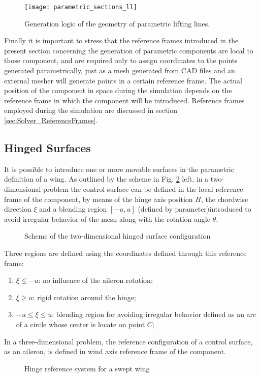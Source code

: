 \begin{figure}[h]
\centering
\texttt{[image: parametric\_sections\_ll]}
\caption{Generation logic of the geometry of parametric lifting lines.}
\label{fig:parametric_sections_ll}
\end{figure}

Finally it is important to stress that the reference frames introduced in the present section concerning the generation of parametric components are local to those component, and are required only to assign coordinates to the points generated parametrically, just as a mesh generated from CAD files and an external mesher will generate points in a certain reference frame. The actual position of the component in space during the simulation depends on the reference frame in which the component will be introduced. Reference frames employed during the simulation are discussed in section \ref{sec:Solver_ReferenceFrames}.

\subsection{Hinged Surfaces}
\label{sec:Hinge_surfaces}
It is possible to introduce one or more movable surfaces in the parametric definition of a wing.
As outlined by the scheme in Fig. \ref{fig:hinge} left, in a two-dimensional problem the control surface can be defined in the local reference frame of the component, by means of the hinge axis position $H$, the chordwise direction $\xi$ and a blending region $[-u, u]$ (defined by  parameter)introduced to avoid irregular behavior of the mesh along with the rotation angle $\theta$.
\begin{figure}[htbp]
\vspace{-3cm}
\centering
    \def\svgwidth{\columnwidth}
    
    \caption{Scheme of the two-dimensional hinged surface configuration}
    \label{fig:hinge}
\end{figure}
Three regions are defined using the coordinates defined through this reference frame:
\begin{enumerate}
 \item $\xi \leq -u$: no influence of the aileron rotation;
 \item $\xi \geq  u$: rigid rotation around the hinge;
 \item $-u \le \xi \le  u$: blending region for avoiding irregular behavior defined as an arc of a circle whose center is locate on point $C$;
\end{enumerate}
In a three-dimensional problem, the reference configuration of a control surface, as an aileron, is defined in wind axis reference frame of the component.
\begin{figure}[htbp]
    \centering
    \def\svgwidth{\columnwidth}
    
    \caption{Hinge reference system for a swept wing}
     \label{fig:hingeref}
\end{figure}

